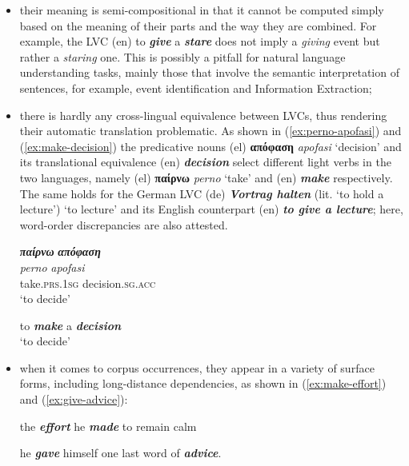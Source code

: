 \documentclass[output=paper,colorlinks,citecolor=brown]{langscibook}
\begin{document}
\begin{itemize}
    \item their meaning is semi-compositional in that it cannot be computed simply based on the meaning of their parts and the way they are combined. For example, the LVC (en) to \textbf{\em{give}} a \textbf{\em{stare}} does not imply a \textit{giving} event but rather a \textit{staring} one. This is possibly a pitfall for natural language understanding tasks, mainly those that involve the semantic interpretation of sentences, for example, event identification and Information Extraction;
    \item there is hardly any cross-lingual equivalence between LVCs, thus rendering their automatic translation problematic. As shown in (\ref{ex:perno-apofasi}) and (\ref{ex:make-decision}) the predicative nouns (el) \textbf{απόφαση} \textit{apofasi} `decision' and its translational equivalence (en) \textbf{\em{decision}} select different light verbs in the two languages, namely (el) \textbf{παίρνω} \textit{perno} `take' and (en) \textbf{\em{make}} respectively. The same holds for the German LVC (de) \textbf{\em{Vortrag halten}} (lit. `to hold a lecture') `to lecture' and its English counterpart (en) \textbf{\em{to give a lecture}}; here, word-order discrepancies are also attested.
    


\ea
\label{ex:perno-apofasi}
\settowidth {} 
\glll 
\textbf{\em{παίρνω}}       	\textbf{\em{απόφαση}}\\
\textit{perno}       	\textit{apofasi}\\
take.\textsc{prs.1sg}             decision.\textsc{sg.acc}\\
\glt ‘to decide’
\z


\ea
\label{ex:make-decision}
\settowidth {} 
to \textbf{\em{make}}      a 	\textbf{\em{decision}}\\
\glt ‘to decide’
\z

    
   \item when it comes to corpus occurrences, they appear in a variety of surface forms, including long-distance dependencies, as shown in (\ref{ex:make-effort}) and (\ref{ex:give-advice}):

\ea
\label{ex:make-effort}
\settowidth {}
the \textbf{\em{effort}} he \textbf{\em{made}} to remain calm
\z

\ea
\label{ex:give-advice}
\settowidth {}
he \textbf{\em{gave}} himself one last word of \textbf{\em{advice}}.
\z



\end{itemize}
\end{document}
